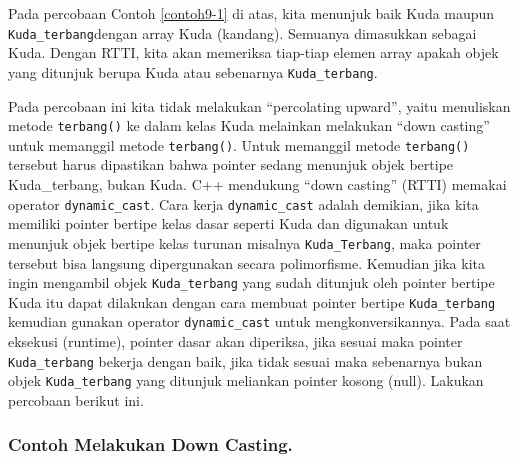 Pada percobaan Contoh \ref{contoh9-1} di atas, kita menunjuk baik Kuda maupun
\texttt{Kuda\_terbang}dengan array Kuda (kandang). Semuanya dimasukkan
sebagai Kuda. Dengan RTTI, kita akan memeriksa tiap-tiap elemen array
apakah objek yang ditunjuk berupa Kuda atau sebenarnya
\texttt{Kuda\_terbang}.

Pada percobaan ini kita tidak melakukan ``percolating upward'', yaitu
menuliskan metode \texttt{terbang()} ke dalam kelas Kuda melainkan
melakukan ``down casting'' untuk memanggil metode \texttt{terbang()}.
Untuk memanggil metode \texttt{terbang()} tersebut harus dipastikan
bahwa pointer sedang menunjuk objek bertipe Kuda\_terbang, bukan Kuda.
C++ mendukung ``down casting'' (RTTI) memakai operator
\texttt{dynamic\_cast}. Cara kerja \texttt{dynamic\_cast} adalah
demikian, jika kita memiliki pointer bertipe kelas dasar seperti Kuda
dan digunakan untuk menunjuk objek bertipe kelas turunan misalnya
\texttt{Kuda\_Terbang}, maka pointer tersebut bisa langsung dipergunakan
secara polimorfisme. Kemudian jika kita ingin mengambil objek
\texttt{Kuda\_terbang} yang sudah ditunjuk oleh pointer bertipe Kuda itu
dapat dilakukan dengan cara membuat pointer bertipe
\texttt{Kuda\_terbang} kemudian gunakan operator \texttt{dynamic\_cast}
untuk mengkonversikannya. Pada saat eksekusi (runtime), pointer dasar
akan diperiksa, jika sesuai maka pointer \texttt{Kuda\_terbang} bekerja
dengan baik, jika tidak sesuai maka sebenarnya bukan objek
\texttt{Kuda\_terbang} yang ditunjuk meliankan pointer kosong (null).
Lakukan percobaan berikut ini.

\subsubsection*{Contoh  Melakukan Down Casting.}

